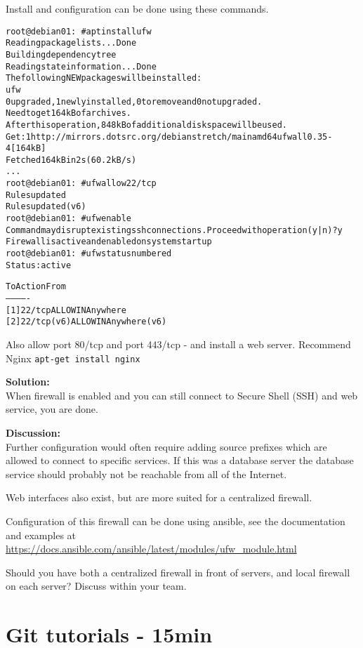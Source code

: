 \documentclass[a4paper,11pt,notitlepage]{report}
\begin{document}
Install and configuration can be done using these commands.
\begin{alltt}
root@debian01:~# apt install ufw
Reading package lists... Done
Building dependency tree
Reading state information... Done
The following NEW packages will be installed:
  ufw
0 upgraded, 1 newly installed, 0 to remove and 0 not upgraded.
Need to get 164 kB of archives.
After this operation, 848 kB of additional disk space will be used.
Get:1 http://mirrors.dotsrc.org/debian stretch/main amd64 ufw all 0.35-4 [164 kB]
Fetched 164 kB in 2s (60.2 kB/s)
...
root@debian01:~# ufw allow 22/tcp
Rules updated
Rules updated (v6)
root@debian01:~# ufw enable
Command may disrupt existing ssh connections. Proceed with operation (y|n)? y
Firewall is active and enabled on system startup
root@debian01:~# ufw status numbered
Status: active

     To                         Action      From
     --                         ------      ----
[ 1] 22/tcp                     ALLOW IN    Anywhere
[ 2] 22/tcp (v6)                ALLOW IN    Anywhere (v6)
\end{alltt}

Also allow port 80/tcp and port 443/tcp - and install a web server. Recommend Nginx \verb+apt-get install nginx+

{\bf Solution:}\\
When firewall is enabled and you can still connect to Secure Shell (SSH) and web service, you are done.

{\bf Discussion:}\\
Further configuration would often require adding source prefixes which are allowed to connect to specific services. If this was a database server the database service should probably not be reachable from all of the Internet.

Web interfaces also exist, but are more suited for a centralized firewall.

Configuration of this firewall can be done using ansible, see the documentation and examples at \url{https://docs.ansible.com/ansible/latest/modules/ufw_module.html}

Should you have both a centralized firewall in front of servers, and local firewall on each server? Discuss within your team.


\chapter{Git tutorials - 15min}
\label{ex:git-tutorial}
\end{document}
